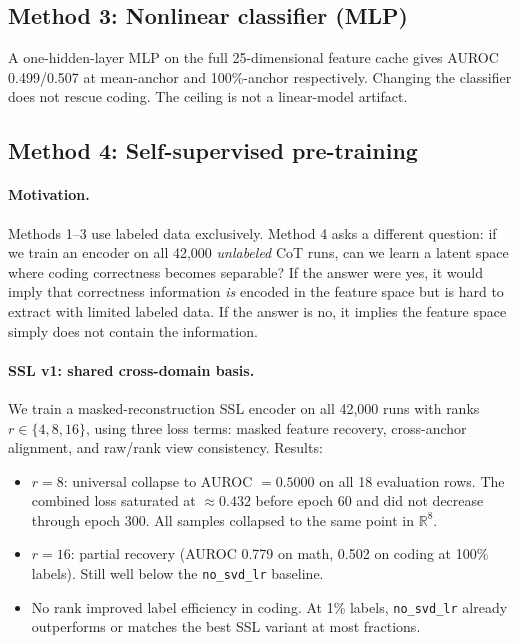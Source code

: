 \documentclass{article}
\begin{document}
\subsection{Method 3: Nonlinear classifier (MLP)}

A one-hidden-layer MLP on the full 25-dimensional feature cache gives AUROC 0.499/0.507 at mean-anchor and 100\%-anchor respectively. Changing the classifier does not rescue coding. The ceiling is not a linear-model artifact.

\subsection{Method 4: Self-supervised pre-training}

\label{sec:ssl}
\paragraph{Motivation.} Methods 1--3 use labeled data exclusively. Method 4 asks a different question: if we train an encoder on all 42,000 \emph{unlabeled} CoT runs, can we learn a latent space where coding correctness becomes separable? If the answer were yes, it would imply that correctness information \emph{is} encoded in the feature space but is hard to extract with limited labeled data. If the answer is no, it implies the feature space simply does not contain the information.

\paragraph{SSL v1: shared cross-domain basis.} We train a masked-reconstruction SSL encoder on all 42,000 runs with ranks $r \in \{4, 8, 16\}$, using three loss terms: masked feature recovery, cross-anchor alignment, and raw/rank view consistency. Results:

\begin{itemize}
  \setlength\itemsep{0.15em}
  \item $r=8$: universal collapse to AUROC $= 0.5000$ on all 18 evaluation rows. The combined loss saturated at $\approx 0.432$ before epoch 60 and did not decrease through epoch 300. All samples collapsed to the same point in $\mathbb{R}^8$.
  \item $r=16$: partial recovery (AUROC 0.779 on math, 0.502 on coding at 100\% labels). Still well below the \texttt{no\_svd\_lr} baseline.
  \item No rank improved label efficiency in coding. At 1\% labels, \texttt{no\_svd\_lr} already outperforms or matches the best SSL variant at most fractions.
\end{itemize}
\end{document}
